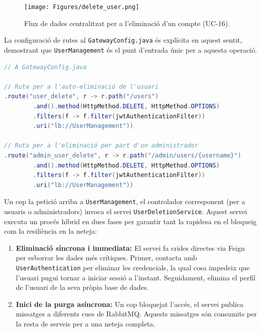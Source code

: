\begin{figure}[H]
    \centering
    \texttt{[image: Figures/delete\_user.png]}
    \caption{Flux de dades centralitzat per a l'eliminació d'un compte (UC-16).}
\end{figure}

La configuració de rutes al \texttt{GatewayConfig.java} és explícita en aquest sentit, demostrant que \texttt{UserManagement} és el punt d'entrada únic per a aquesta operació.

\begin{lstlisting}[language=Java, caption={Rutes d'eliminació a `GatewayConfig.java`}]
// A GatewayConfig.java

// Ruta per a l'auto-eliminació de l'usuari
.route("user_delete", r -> r.path("/users")
        .and().method(HttpMethod.DELETE, HttpMethod.OPTIONS)
        .filters(f -> f.filter(jwtAuthenticationFilter))
        .uri("lb://UserManagement"))

// Ruta per a l'eliminació per part d'un administrador
.route("admin_user_delete", r -> r.path("/admin/users/{username}")
        .and().method(HttpMethod.DELETE, HttpMethod.OPTIONS)
        .filters(f -> f.filter(jwtAuthenticationFilter))
        .uri("lb://UserManagement"))
\end{lstlisting}

Un cop la petició arriba a \texttt{UserManagement}, el controlador corresponent (per a usuaris o administradors) invoca el servei \texttt{UserDeletionService}. Aquest servei executa un procés híbrid en dues fases per garantir tant la rapidesa en el bloqueig com la resiliència en la neteja:

\begin{enumerate}
    \item \textbf{Eliminació síncrona i immediata:} El servei fa crides directes via Feign per esborrar les dades més crítiques. Primer, contacta amb \texttt{UserAuthentication} per eliminar les credencials, la qual cosa impedeix que l'usuari pugui tornar a iniciar sessió a l'instant. Seguidament, elimina el perfil de l'usuari de la seva pròpia base de dades.
    
    \item \textbf{Inici de la purga asíncrona:} Un cop bloquejat l'accés, el servei publica missatges a diferents cues de RabbitMQ. Aquests missatges són consumits per la resta de serveis per a una neteja completa.
\end{enumerate}

